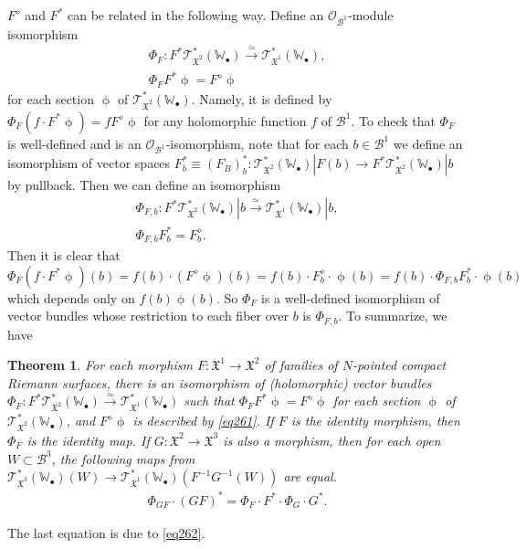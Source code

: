 \documentclass[12pt,a4paper,notitlepage]{report}
\theoremstyle{definition}
\theoremstyle{plain}
\newtheorem{thm}[df]{Theorem}
\newcommand{\fk}{\mathfrak}
\newcommand{\mc}{\mathcal}
\newcommand{\scr}{\mathscr}
\newcommand{\blt}{\bullet}
\newcommand{\Wbb}{\mathbb W}
\numberwithin{equation}{section}
\begin{document}
 
$F^\diamond$ and $F^*$ can be related in the following way. Define an $\scr O_{\mc B^1}$-module  isomorphism
\begin{gather}
\Phi_F:F^*\scr T_{\fk X^2}^*(\Wbb_\blt)\xrightarrow{\simeq} \scr T_{\fk X^1}^*(\Wbb_\blt),\nonumber\\
\Phi_F F^*\upphi=F^\diamond\upphi
\end{gather}
for each section $\upphi$ of $\scr T_{\fk X^2}^*(\Wbb_\blt)$. Namely, it is defined by $\Phi_F (f\cdot F^*\upphi)=fF^\diamond\upphi$ for any holomorphic function $f$ of $\mc B^1$. To check that $\Phi_F$ is well-defined and is an $\scr O_{\mc B^1}$-isomorphism, note that for each $b\in \mc B^1$ we define an isomorphism of vector spaces $F_b^*\equiv (F_B)_b^*:\scr T_{\fk X^2}^*(\Wbb_\blt)|F(b)\rightarrow F^*\scr T_{\fk X^2}^*(\Wbb_\blt)|b$ by pullback. Then we can define an isomorphism
\begin{gather*}
\Phi_{F,b}:F^*\scr T_{\fk X^2}^*(\Wbb_\blt)|b\xrightarrow{\simeq} \scr T_{\fk X^1}^*(\Wbb_\blt)|b,\\
\Phi_{F,b}F^*_b=F_b^\diamond.
\end{gather*}
Then it is clear that $\Phi_F(f\cdot  F^*\upphi)(b)=f(b)\cdot (F^\diamond\upphi)(b)=f(b)\cdot F_b^\diamond\cdot \upphi(b)=f(b)\cdot \Phi_{F,b}F^*_b\cdot \upphi(b)$ which depends only on $f(b)\upphi(b)$. So $\Phi_F$ is a well-defined isomorphism of vector bundles whose restriction to each fiber over $b$ is $\Phi_{F,b}$. To summarize, we have
\begin{thm}
For each morphism $F:\fk X^1\rightarrow\fk X^2$ of families of $N$-pointed compact Riemann surfaces, there is an isomorphism of (holomorphic) vector bundles $\Phi_F:F^*\scr T_{\fk X^2}^*(\Wbb_\blt)\xrightarrow{\simeq} \scr T_{\fk X^1}^*(\Wbb_\blt)$ such that $\Phi_F F^*\upphi=F^\diamond\upphi$ for each section $\upphi$ of $\scr T_{\fk X^2}^*(\Wbb_\blt)$, and $F^\diamond\upphi$ is described by \eqref{eq261}. If $F$ is the identity morphism, then $\Phi_F$ is the identity map. If $G:\fk X^2\rightarrow\fk X^3$ is also a morphism, then for each open $W\subset\mc B^3$, the following maps from $\scr T_{\fk X^3}^*(\Wbb_\blt)(W)\rightarrow \scr T_{\fk X^1}^*(\Wbb_\blt)(F^{-1}G^{-1}(W))$ are equal.
\begin{align*}
\Phi_{GF}\cdot (GF)^*=\Phi_F \cdot F^*\cdot  \Phi_G\cdot  G^*.
\end{align*}
\end{thm}
The last equation is due to \eqref{eq262}.
\end{document}
